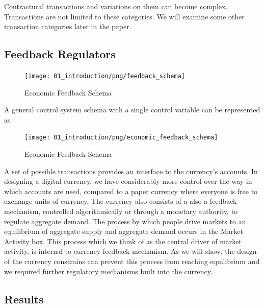 Contractural transactions and variations on them can become complex. Transactions are not limited to
these categories. We will examine some other transaction categories later in the paper.

\subsection{Feedback Regulators}

\begin{figure}[H]
\centering
\texttt{[image: 01\_introduction/png/feedback\_schema]}
\caption{Economic Feedback Schema}
\label{fig:feedback_schema1}
\end{figure}

A general control system schema with a single control variable can be represented as

\begin{figure}[H]
\centering
\texttt{[image: 01\_introduction/png/economic\_feedback\_schema]}
\caption{Economic Feedback Schema}
\label{fig:economic_feedback_schema1}
\end{figure}

A set of possible transactions provides an interface to the currency's accounts. In designing a
digital currency, we have considerably more control over the way in which accounts are used,
compared to a paper currency where everyone is free to exchange units of currency. The currency also
consists of a 
also a feedback mechanism, controlled algorithmically or through a monetary authority, to regulate
aggregate demand. The process by which people drive markets to an equilibrium of aggregate supply
and aggregate demand occurs in the Market Activity box. This process which we think of as the
central driver of market activity, is internal to currency feedback mechanism. As we will show, the
design of the currency constrains can prevent this process from reaching equilibrium and we
required further regulatory mechanisms built into the currency.

\subsection{Results}

%


